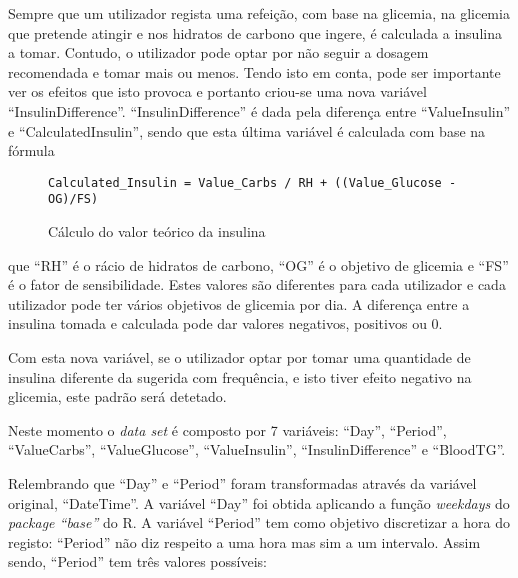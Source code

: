 Sempre que um utilizador regista uma refeição, com base na glicemia, na glicemia que pretende atingir e nos hidratos de carbono que ingere, é calculada a insulina a tomar. Contudo, o utilizador pode optar por não seguir a dosagem recomendada e tomar mais ou menos. Tendo isto em conta, pode ser importante ver os efeitos que isto provoca e portanto criou-se uma nova variável ``Insulin\textunderscore Difference''. ``Insulin\textunderscore Difference'' é dada pela diferença entre ``Value\textunderscore Insulin'' e ``Calculated\textunderscore Insulin'', sendo que esta última variável é calculada com base na fórmula

\begin{figure}[H]
\begin{lstlisting}
Calculated_Insulin = Value_Carbs / RH + ((Value_Glucose - OG)/FS)

\end{lstlisting}
\label{fig:calculo}
\caption{Cálculo do valor teórico da insulina}
\end{figure}
que ``RH'' é o rácio de hidratos de carbono, ``OG''  é o objetivo de glicemia e ``FS''  é o fator de sensibilidade. Estes valores são diferentes para cada utilizador e cada utilizador pode ter vários objetivos de glicemia por dia. A diferença entre a insulina tomada e calculada pode dar valores negativos, positivos ou 0.

Com esta nova variável, se o utilizador optar por tomar uma quantidade de insulina diferente da sugerida com frequência, e isto tiver efeito negativo na glicemia, este padrão será detetado. 

Neste momento o \textit{data set} é composto por 7 variáveis: ``Day'', ``Period'', ``Value\textunderscore Carbs'', ``Value\textunderscore Glucose'', ``Value\textunderscore Insulin'', ``Insulin\textunderscore Difference'' e ``Blood\textunderscore TG''.



Relembrando que ``Day'' e ``Period'' foram transformadas através da variável original, ``DateTime''. A variável ``Day'' foi obtida aplicando a função \textit{weekdays} do \textit{package ``base''} do R. A variável ``Period'' tem como objetivo discretizar a hora do registo: ``Period'' não diz respeito a uma hora mas sim a um intervalo. Assim sendo, ``Period'' tem três valores possíveis:

